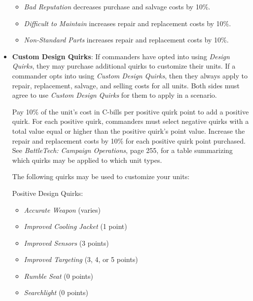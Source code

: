 \documentclass{article}
\begin{document}
\begin{itemize}
\begin{itemize}
\item \emph{Bad Reputation} decreases purchase and salvage costs by 10\%.

\item \emph{Difficult to Maintain} increases repair and replacement costs by 10\%.

\item \emph{Non-Standard Parts} increases repair and replacement costs by 10\%.

\end{itemize}

\item {\bfseries Custom Design Quirks}: If commanders have opted into using \emph{Design Quirks}, they may purchase additional quirks to customize their units.
If a commander opts into using \emph{Custom Design Quirks}, then they always apply to repair, replacement, salvage, and selling costs for all units.
Both sides must agree to use \emph{Custom Design Quirks} for them to apply in a scenario.

Pay 10\% of the unit's cost in C-bills per positive quirk point to add a positive quirk.
For each positive quirk, commanders must select negative quirks with a total value equal or higher than the positive quirk's point value.
Increase the repair and replacement costs by 10\% for each positive quirk point purchased.
See \emph{BattleTech: Campaign Operations}, page 255, for a table summarizing which quirks may be applied to which unit types.

The following quirks may be used to customize your units:

Positive Design Quirks:

\begin{multicols}{2}

\begin{itemize}

\item \emph{Accurate Weapon} (varies)

\item \emph{Improved Cooling Jacket} (1 point)

\item \emph{Improved Sensors} (3 points)

\item \emph{Improved Targeting} (3, 4, or 5 points)

\item \emph{Rumble Seat} (0 points)

\item \emph{Searchlight} (0 points)


\end{itemize}
\end{multicols}
\end{itemize}
\end{document}
